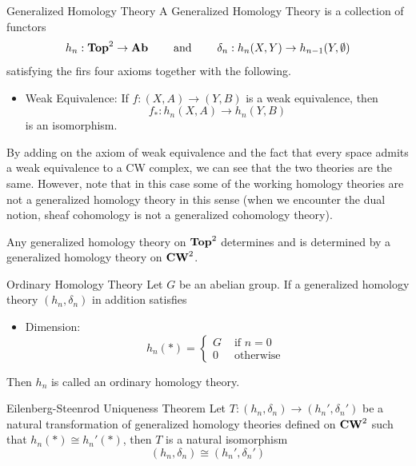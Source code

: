 \documentclass[a4paper]{article}
\begin{document}
\begin{defn}{Generalized Homology Theory}{} A Generalized Homology Theory is a collection of functors $$h_n:\bold{Top}^2\to\bold{Ab}\;\;\;\;\;\;\;\text{ and }\;\;\;\;\;\;\;\delta_n:h_n(X,Y)\to h_{n-1}(Y,\emptyset)$$ satisfying the firs four axioms together with the following. 
\begin{itemize}
\item Weak Equivalence: If $f:(X,A)\to(Y,B)$ is a weak equivalence, then $$f_\ast:h_n(X,A)\to h_n(Y,B)$$ is an isomorphism. 
\end{itemize}
\end{defn}

By adding on the axiom of weak equivalence and the fact that every space admits a weak equivalence to a CW complex, we can see that the two theories are the same. However, note that in this case some of the working homology theories are not a generalized homology theory in this sense (when we encounter the dual notion, sheaf cohomology is not a generalized cohomology theory). 

\begin{thm}{}{} Any generalized homology theory on $\bold{Top}^2$ determines and is determined by a generalized homology theory on $\bold{CW}^2$.
\end{thm}

\begin{defn}{Ordinary Homology Theory}{} Let $G$ be an abelian group. If a generalized homology theory $(h_n,\delta_n)$ in addition satisfies 
\begin{itemize}
\item Dimension: $$h_n(\ast)=\begin{cases}
G & \text{ if } n=0\\
0 & \text{ otherwise }
\end{cases}$$
\end{itemize}
Then $h_n$ is called an ordinary homology theory. 
\end{defn}

\begin{thm}{Eilenberg-Steenrod Uniqueness Theorem}{} Let $T:(h_n,\delta_n)\to(h_n',\delta_n')$ be a natural transformation of generalized homology theories defined on $\bold{CW}^2$ such that $h_n(\ast)\cong h_n'(\ast)$, then $T$ is a natural isomorphism $$(h_n,\delta_n)\cong(h_n',\delta_n')$$
\end{thm}
\end{document}
